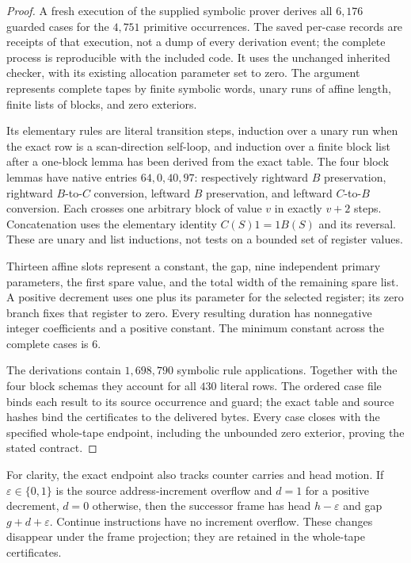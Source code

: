 \begin{proof}
A fresh execution of the supplied symbolic prover derives all
$6{,}176$ guarded cases for the $4{,}751$ primitive occurrences. The saved
per-case records are receipts of that execution, not a dump of every
derivation event; the complete process is reproducible with the included
code. It uses the unchanged inherited checker, with its existing allocation
parameter set to zero. The argument represents complete tapes by finite symbolic words,
unary runs of affine length, finite lists of blocks, and zero exteriors.

Its elementary rules are literal transition steps, induction over a unary
run when the exact row is a scan-direction self-loop, and induction over a
finite block list after a one-block lemma has been derived from the exact
table.  The four block lemmas have native entries $64,0,40,97$: respectively
rightward $B$ preservation, rightward $B$-to-$C$ conversion, leftward $B$
preservation, and leftward $C$-to-$B$ conversion.  Each crosses one arbitrary
block of value $v$ in exactly $v+2$ steps.  Concatenation uses the elementary
identity $C(S)1=1B(S)$ and its reversal.  These are unary and list inductions,
not tests on a bounded set of register values.

Thirteen affine slots represent a constant, the gap, nine independent
primary parameters, the first spare value, and the total width of the
remaining spare list.  A positive decrement uses one plus its parameter
for the selected register; its zero branch fixes that register to zero.
Every resulting duration has nonnegative integer coefficients and a positive
constant.  The minimum constant across the complete cases is $6$.

The derivations contain $1{,}698{,}790$ symbolic rule applications.  Together
with the four block schemas they account for all $430$ literal rows.  The
ordered case file binds each result to its source occurrence and guard;
the exact table and source hashes bind the certificates to the delivered
bytes.  Every case closes with the specified whole-tape endpoint, including
the unbounded zero exterior, proving the stated contract.
\end{proof}

For clarity, the exact endpoint also tracks counter carries and head motion.
If $\varepsilon\in\{0,1\}$ is the source address-increment overflow and
$d=1$ for a positive decrement, $d=0$ otherwise, then the successor frame
has head $h-\varepsilon$ and gap $g+d+\varepsilon$.  Continue instructions
have no increment overflow.  These changes disappear under the frame
projection; they are retained in the whole-tape certificates.

